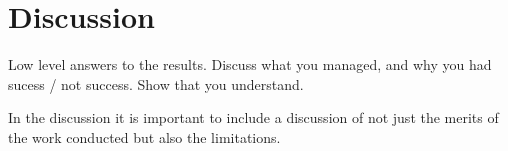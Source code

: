 \section{Discussion}
Low level answers to the results. 
Discuss what you managed, and why you had sucess / not success. 
Show that you understand.

In the discussion it is important to include a discussion of not just the merits of the work conducted but also the limitations. 

